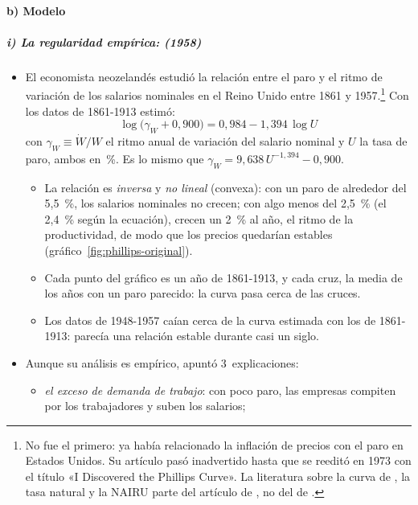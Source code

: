 \documentclass[11pt]{article}
\begin{document}
\paragraph{b) Modelo}

\subparagraph{i) La regularidad empírica:  (1958)}

\begin{itemize}
\item El economista neozelandés  estudió la relación entre el paro y el ritmo de variación de los salarios nominales en el Reino Unido entre 1861 y 1957.\footnote{No fue el primero:  ya había relacionado la inflación de precios con el paro en Estados Unidos\nocite{Fisher1926Statistical}. Su artículo pasó inadvertido hasta que se reeditó en 1973 con el título «I Discovered the Phillips Curve»\nocite{Fisher1973Discovered}. La literatura sobre la curva de , la tasa natural y la NAIRU parte del artículo de , no del de .} Con los datos de 1861-1913 estimó\nocite{Phillips1958}:
  \begin{equation}
  \log\big(\gamma_W+0{,}900\big)=0{,}984-1{,}394\,\log U \label{eq:phillips-original}
  \end{equation}
  con $\gamma_W\equiv\dot W/W$ el ritmo anual de variación del salario nominal y $U$ la tasa de paro, ambos en~\%. Es lo mismo que $\gamma_W=9{,}638\,U^{-1{,}394}-0{,}900$.
  \begin{itemize}
  \item La relación es \emph{inversa} y \emph{no lineal} (convexa): con un paro de alrededor del 5,5~\%, los salarios nominales no crecen; con algo menos del 2,5~\% (el 2,4~\% según la ecuación), crecen un 2~\% al año, el ritmo de la productividad, de modo que los precios quedarían estables\nocite{Phillips1958} (gráfico~\ref{fig:phillips-original}).
  \item Cada punto del gráfico es un año de 1861-1913, y cada cruz, la media de los años con un paro parecido: la curva pasa cerca de las cruces.
  \item Los datos de 1948-1957 caían cerca de la curva estimada con los de 1861-1913: parecía una relación estable durante casi un siglo.
  \end{itemize}
\item Aunque su análisis es empírico,  apuntó 3~explicaciones:
  \begin{itemize}
  \item \emph{el exceso de demanda de trabajo}: con poco paro, las empresas compiten por los trabajadores y suben los salarios;

\end{itemize}
\end{itemize}
\end{document}
